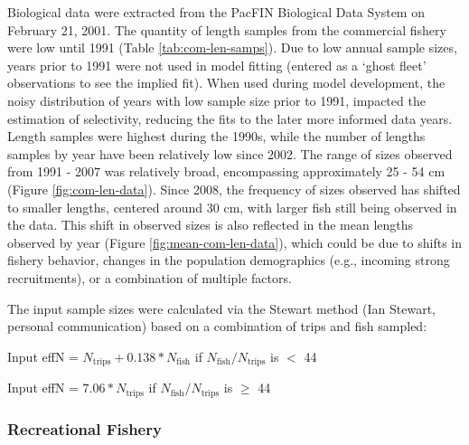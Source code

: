 \documentclass[11pt,
  english,
  a4paper,
]{article}
\begin{document}
Biological data were extracted from the PacFIN Biological Data System on February 21, 2001. The quantity of length samples from the commercial fishery were low until 1991 (Table \ref{tab:com-len-samps}). Due to low annual sample sizes, years prior to 1991 were not used in model fitting (entered as a `ghost fleet' observations to see the implied fit). When used during model development, the noisy distribution of years with low sample size prior to 1991, impacted the estimation of selectivity, reducing the fits to the later more informed data years. Length samples were highest during the 1990s, while the number of lengths samples by year have been relatively low since 2002. The range of sizes observed from 1991 - 2007 was relatively broad, encompassing approximately 25 - 54 cm (Figure \ref{fig:com-len-data}). Since 2008, the frequency of sizes observed has shifted to smaller lengths, centered around 30 cm, with larger fish still being observed in the data. This shift in observed sizes is also reflected in the mean lengths observed by year (Figure \ref{fig:mean-com-len-data}), which could be due to shifts in fishery behavior, changes in the population demographics (e.g., incoming strong recruitments), or a combination of multiple factors.

\leavevmode\tagmcend\tagstructend\par


The input sample sizes were calculated via the Stewart method (Ian Stewart, personal communication) based on a combination of trips and fish sampled:

\leavevmode\tagmcend\tagstructend\par

\begin{centering}

Input effN = $N_{\text{trips}} + 0.138 * N_{\text{fish}}$ if $N_{\text{fish}}/N_{\text{trips}}$ is $<$ 44

Input effN = $7.06 * N_{\text{trips}}$ if $N_{\text{fish}}/N_{\text{trips}}$ is $\geq$ 44

\end{centering}


\hypertarget{recreational-fishery}{%
\subsubsection{Recreational Fishery}\label{recreational-fishery}}
\end{document}
